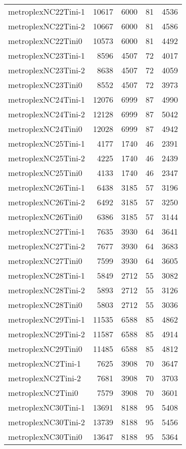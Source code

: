 \begin{longtable}{lrrrr}
metroplexNC22Tini-1 & 10617 & 6000 & 81 & 4536 \\
metroplexNC22Tini-2 & 10667 & 6000 & 81 & 4586 \\
metroplexNC22Tini0 & 10573 & 6000 & 81 & 4492 \\
metroplexNC23Tini-1 & 8596 & 4507 & 72 & 4017 \\
metroplexNC23Tini-2 & 8638 & 4507 & 72 & 4059 \\
metroplexNC23Tini0 & 8552 & 4507 & 72 & 3973 \\
metroplexNC24Tini-1 & 12076 & 6999 & 87 & 4990 \\
metroplexNC24Tini-2 & 12128 & 6999 & 87 & 5042 \\
metroplexNC24Tini0 & 12028 & 6999 & 87 & 4942 \\
metroplexNC25Tini-1 & 4177 & 1740 & 46 & 2391 \\
metroplexNC25Tini-2 & 4225 & 1740 & 46 & 2439 \\
metroplexNC25Tini0 & 4133 & 1740 & 46 & 2347 \\
metroplexNC26Tini-1 & 6438 & 3185 & 57 & 3196 \\
metroplexNC26Tini-2 & 6492 & 3185 & 57 & 3250 \\
metroplexNC26Tini0 & 6386 & 3185 & 57 & 3144 \\
metroplexNC27Tini-1 & 7635 & 3930 & 64 & 3641 \\
metroplexNC27Tini-2 & 7677 & 3930 & 64 & 3683 \\
metroplexNC27Tini0 & 7599 & 3930 & 64 & 3605 \\
metroplexNC28Tini-1 & 5849 & 2712 & 55 & 3082 \\
metroplexNC28Tini-2 & 5893 & 2712 & 55 & 3126 \\
metroplexNC28Tini0 & 5803 & 2712 & 55 & 3036 \\
metroplexNC29Tini-1 & 11535 & 6588 & 85 & 4862 \\
metroplexNC29Tini-2 & 11587 & 6588 & 85 & 4914 \\
metroplexNC29Tini0 & 11485 & 6588 & 85 & 4812 \\
metroplexNC2Tini-1 & 7625 & 3908 & 70 & 3647 \\
metroplexNC2Tini-2 & 7681 & 3908 & 70 & 3703 \\
metroplexNC2Tini0 & 7579 & 3908 & 70 & 3601 \\
metroplexNC30Tini-1 & 13691 & 8188 & 95 & 5408 \\
metroplexNC30Tini-2 & 13739 & 8188 & 95 & 5456 \\
metroplexNC30Tini0 & 13647 & 8188 & 95 & 5364 \\

\end{longtable}
